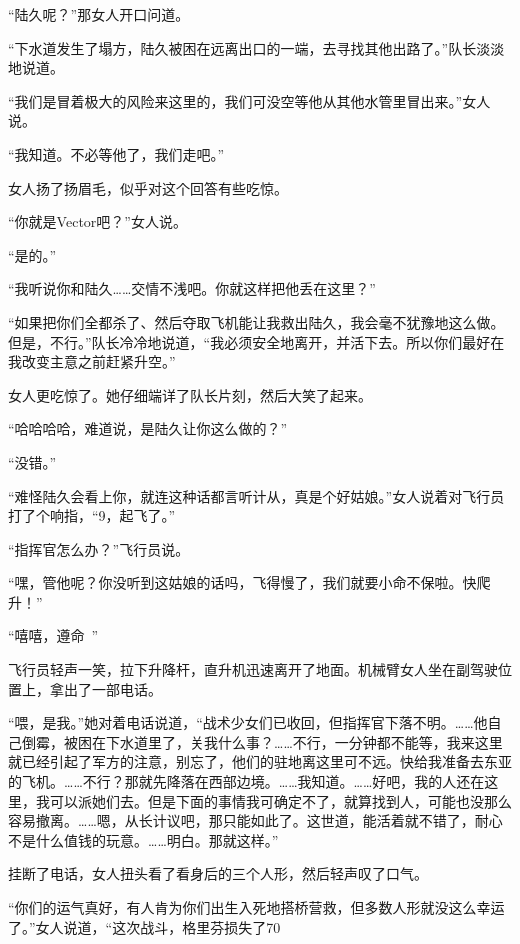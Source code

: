 “陆久呢？”那女人开口问道。

“下水道发生了塌方，陆久被困在远离出口的一端，去寻找其他出路了。”队长淡淡地说道。

“我们是冒着极大的风险来这里的，我们可没空等他从其他水管里冒出来。”女人说。

“我知道。不必等他了，我们走吧。”

女人扬了扬眉毛，似乎对这个回答有些吃惊。

“你就是Vector吧？”女人说。

“是的。”

“我听说你和陆久……交情不浅吧。你就这样把他丢在这里？”

“如果把你们全都杀了、然后夺取飞机能让我救出陆久，我会毫不犹豫地这么做。但是，不行。”队长冷冷地说道，“我必须安全地离开，并活下去。所以你们最好在我改变主意之前赶紧升空。”

女人更吃惊了。她仔细端详了队长片刻，然后大笑了起来。

“哈哈哈哈，难道说，是陆久让你这么做的？”

“没错。”

“难怪陆久会看上你，就连这种话都言听计从，真是个好姑娘。”女人说着对飞行员打了个响指，“9，起飞了。”

“指挥官怎么办？”飞行员说。

“嘿，管他呢？你没听到这姑娘的话吗，飞得慢了，我们就要小命不保啦。快爬升！”

“嘻嘻，遵命~”

飞行员轻声一笑，拉下升降杆，直升机迅速离开了地面。机械臂女人坐在副驾驶位置上，拿出了一部电话。

“喂，是我。”她对着电话说道，“战术少女们已收回，但指挥官下落不明。……他自己倒霉，被困在下水道里了，关我什么事？……不行，一分钟都不能等，我来这里就已经引起了军方的注意，别忘了，他们的驻地离这里可不远。快给我准备去东亚的飞机。……不行？那就先降落在西部边境。……我知道。……好吧，我的人还在这里，我可以派她们去。但是下面的事情我可确定不了，就算找到人，可能也没那么容易撤离。……嗯，从长计议吧，那只能如此了。这世道，能活着就不错了，耐心不是什么值钱的玩意。……明白。那就这样。”

挂断了电话，女人扭头看了看身后的三个人形，然后轻声叹了口气。

“你们的运气真好，有人肯为你们出生入死地搭桥营救，但多数人形就没这么幸运了。”女人说道，“这次战斗，格里芬损失了70%

